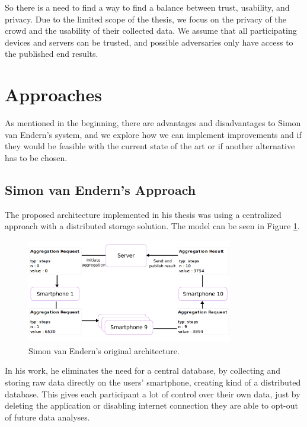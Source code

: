 So there is a need to find a way to find a balance between trust, usability, and privacy. Due to the limited scope of the thesis, we focus on the privacy of the crowd and the usability of their collected data. We assume that all participating devices and servers can be trusted, and possible adversaries only have access to the published end results.

\section{Approaches}
As mentioned in the beginning, there are advantages and disadvantages to Simon van Endern's system, and we explore how we can implement improvements and if they would be feasible with the current state of the art or if another alternative has to be chosen.

\subsection{Simon van Endern's Approach}
The proposed architecture implemented in his thesis was using a centralized approach with a distributed storage solution. The model can be seen in Figure \ref{fig:simon_original}.

\begin{figure}[htpb]
  \centering
  \includegraphics[width=0.8\textwidth]{figures/simon_original.png}
  \caption{Simon van Endern's original architecture.} \label{fig:simon_original}
\end{figure}

In his work, he eliminates the need for a central database, by collecting and storing raw data directly on the users' smartphone, creating kind of a distributed database. This gives each participant a lot of control over their own data, just by deleting the application or disabling internet connection they are able to opt-out of future data analyses.

